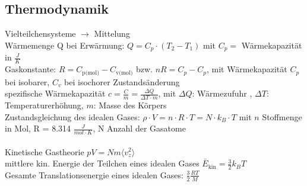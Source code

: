 \documentclass[fs, footer]{latex4ei}
\begin{document}
\begin{multicols*}{4}
\section{Thermodynamik}
Vielteilchensysteme $\rightarrow$ Mittelung\\

Wärmemenge Q bei Erwärmung: $Q = C_p\cdot (T_2 - T_1)$ mit $C_p =$ Wärmekapazität in $\frac{J}{K}$\\
Gaskonstante: $R = C_{\text{p(mol)}} - C_{\text{v(mol)}}$ bzw. $n R = C_p - C_p$, mit Wärmekapazität $C_p$ bei isobarer, $C_v$ bei isochorer Zustandsänderung\\
spezifische Wärmekapazität $c = \frac{C}{m} = \frac{\Delta Q}{\Delta T\cdot m}$, mit $\Delta Q$: Wärmezufuhr , $\Delta T$: Temperaturerhöhung, $m$: Masse des Körpers\\

Zustandsgleichung des idealen Gases: $\rho\cdot V  = n \cdot R\cdot T = N\cdot k_B\cdot T$ mit $n$ Stoffmenge in Mol, R = 8.314 $\frac{J}{mol\cdot K}$, N Anzahl der Gasatome\\%
\\Kinetische Gastheorie $pV = Nm\langle v_z^2 \rangle$\\
mittlere kin. Energie der Teilchen eines idealen Gases $\bar{E}_{\text{kin}} = \frac{3}{2}k_B T$\\ %
Gesamte Translationsenergie eines idealen Gases: $\frac{3}{2}\frac{RT}{M}$\\


\end{multicols*}
\end{document}
